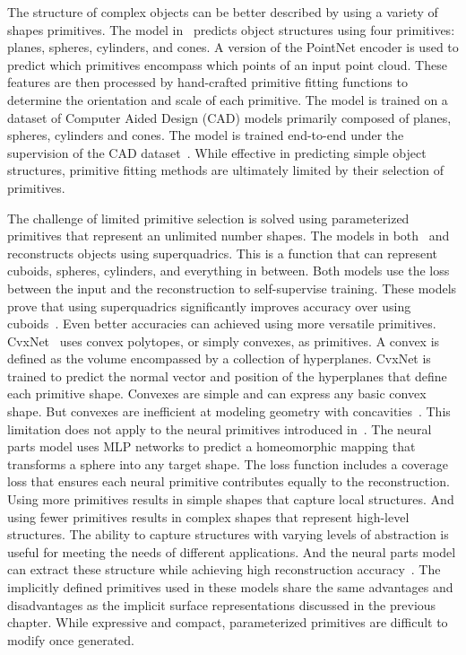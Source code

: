 The structure of complex objects can be better described by using a variety of shapes primitives. The model in~\cite{Li2019} predicts object structures using four primitives: planes, spheres, cylinders, and cones. A version of the PointNet encoder is used to predict which primitives encompass which points of an input point cloud. These features are then processed by hand-crafted primitive fitting functions to determine the orientation and scale of each primitive. The model is trained on a dataset of Computer Aided Design (CAD) models primarily composed of planes, spheres, cylinders and cones. The model is trained end-to-end under the supervision of the CAD dataset~\cite{Li2019}. While effective in predicting simple object structures, primitive fitting methods are ultimately limited by their selection of primitives.

The challenge of limited primitive selection is solved using parameterized primitives that represent an unlimited number shapes. The models in both~\cite{Paschalidou2019} and~\cite{Paschalidou2020} reconstructs objects using superquadrics. This is a function that can represent cuboids, spheres, cylinders, and everything in between. Both models use the loss between the input and the reconstruction to self-supervise training. These models prove that using superquadrics significantly improves accuracy over using cuboids~\cite{Paschalidou2019}. Even better accuracies can achieved using more versatile primitives. CvxNet~\cite{Deng2020} uses convex polytopes, or simply convexes, as primitives. A convex is defined as the volume encompassed by a collection of hyperplanes. CvxNet is trained to predict the normal vector and position of the hyperplanes that define each primitive shape. Convexes are simple and can express any basic convex shape. But convexes are inefficient at modeling geometry with concavities~\cite{Deng2020}. This limitation does not apply to the neural primitives introduced in~\cite{Paschalidou2021}. The neural parts model uses MLP networks to predict a homeomorphic mapping that transforms a sphere into any target shape. The loss function includes a coverage loss that ensures each neural primitive contributes equally to the reconstruction. Using more primitives results in simple shapes that capture local structures. And using fewer primitives results in complex shapes that represent high-level structures. The ability to capture structures with varying levels of abstraction is useful for meeting the needs of different applications. And the neural parts model can extract these structure while achieving high reconstruction accuracy~\cite{Paschalidou2021}. The implicitly defined primitives used in these models share the same advantages and disadvantages as the implicit surface representations discussed in the previous chapter. While expressive and compact, parameterized primitives are difficult to modify once generated.

